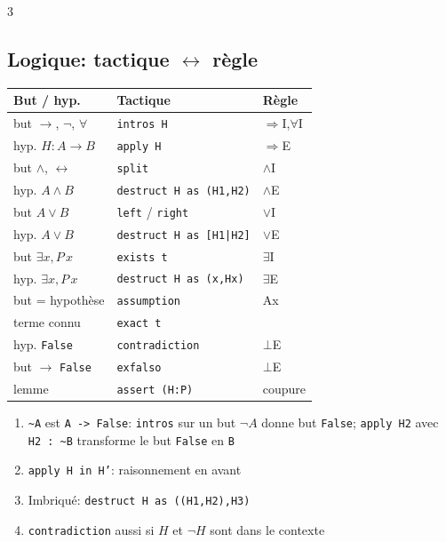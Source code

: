 \documentclass[12pt, a4paper]{article}
\begin{document}
\begin{multicols*}{3}
	\subsection{Logique: tactique $\leftrightarrow$ règle}
	\begin{tabular}{|l|l|l|}
		\hline
		\textbf{But / hyp.}   & \textbf{Tactique}                  & \textbf{Règle} \\
		\hline
		but $\to$, $\neg$, $\forall$ & \texttt{intros H}         & $\Rightarrow$I,$\forall$I \\
		hyp. $H:A\to B$        & \texttt{apply H}                   & $\Rightarrow$E \\
		but $\wedge$, $\leftrightarrow$ & \texttt{split}            & $\wedge$I \\
		hyp. $A\wedge B$       & \texttt{destruct H as (H1,H2)}     & $\wedge$E \\
		but $A\vee B$          & \texttt{left} / \texttt{right}     & $\vee$I \\
		hyp. $A\vee B$         & \texttt{destruct H as [H1|H2]}     & $\vee$E \\
		but $\exists x,P\,x$   & \texttt{exists t}                  & $\exists$I \\
		hyp. $\exists x,P\,x$  & \texttt{destruct H as (x,Hx)}      & $\exists$E \\
		but = hypothèse        & \texttt{assumption}                & Ax \\
		terme connu            & \texttt{exact t}                   & \\
		hyp. \texttt{False}    & \texttt{contradiction}             & $\bot$E \\
		but $\to$ \texttt{False} & \texttt{exfalso}                & $\bot$E \\
		lemme                  & \texttt{assert (H:P)}              & coupure \\
		\hline
	\end{tabular}
	\begin{enumerate}[\roman*.]
		\item \texttt{\~{}A} est \texttt{A -> False}: \texttt{intros} sur un but $\neg A$ donne but \texttt{False}; \texttt{apply H2} avec \texttt{H2 : \~{}B} transforme le but \texttt{False} en \texttt{B}
		\item \texttt{apply H in H'}: raisonnement en avant
		\item Imbriqué: \texttt{destruct H as ((H1,H2),H3)}
		\item \texttt{contradiction} aussi si $H$ et $\neg H$ sont dans le contexte
	\end{enumerate}


\end{multicols*}
\end{document}
